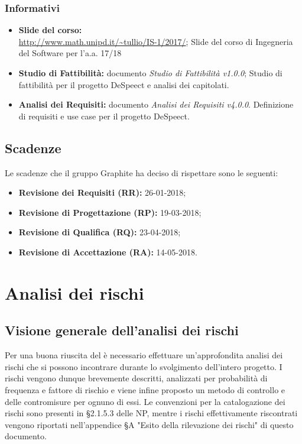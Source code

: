 \documentclass[../PianodiProgetto.tex]{subfiles}
\begin{document}
	\subsection*{Informativi}
	\begin{itemize}
		\item \textbf{Slide del corso:} \\ \url{http://www.math.unipd.it/~tullio/IS-1/2017/};
		\subitem Slide del corso di Ingegneria del Software per l'a.a. 17/18
		\item \textbf{Studio di Fattibilità:} documento \textit{Studio di Fattibilità v1.0.0};
		\subitem Studio di fattibilità per il progetto DeSpeect e analisi dei capitolati.
		\item \textbf{Analisi dei Requisiti:} documento \textit{Analisi dei Requisiti v4.0.0}.
		\subitem Definizione di requisiti e use case per il progetto DeSpeect.
	\end{itemize}
	
	\section{Scadenze}
	Le scadenze che il gruppo Graphite ha deciso di rispettare sono le seguenti:
	\begin{itemize}
		\item \textbf{Revisione dei Requisiti (RR):} 26-01-2018;
		\item \textbf{Revisione di Progettazione (RP):} 19-03-2018;
		\item \textbf{Revisione di Qualifica (RQ):} 23-04-2018;
		\item \textbf{Revisione di Accettazione (RA):} 14-05-2018.
	\end{itemize}
	
	\chapter{Analisi dei rischi}
	
	\section{Visione generale dell'analisi dei rischi}
	
	Per una buona riuscita del  è necessario effettuare un'approfondita analisi dei rischi che si possono incontrare durante lo svolgimento dell'intero progetto. I rischi vengono dunque brevemente descritti, analizzati per probabilità di frequenza e fattore di rischio e viene infine proposto un metodo di controllo e delle contromisure per ognuno di essi. Le convenzioni per la catalogazione dei rischi sono presenti in §2.1.5.3 delle NP, mentre i rischi effettivamente riscontrati vengono riportati nell'appendice §A "Esito della rilevazione dei rischi" di questo documento.
	
\end{document}
